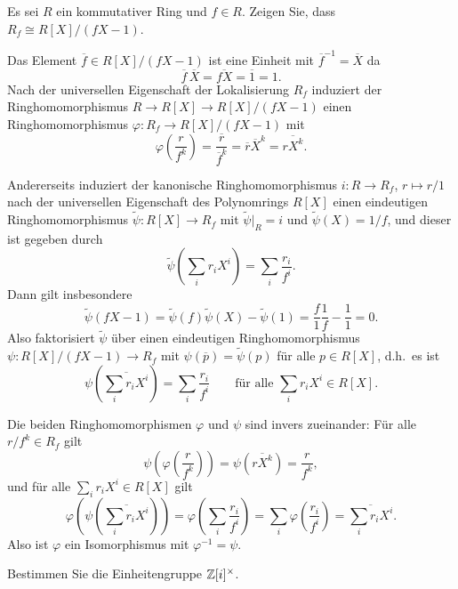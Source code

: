 

\begin{question}
  Es sei $R$ ein kommutativer Ring und $f \in R$.
  Zeigen Sie, dass $R_f \cong R[X]/(fX-1)$.
\end{question}


\begin{solution}
  Das Element $\overline{f} \in R[X]/(fX-1)$ ist eine Einheit mit $\overline{f}^{-1} = \overline{X}$ da
  \[
      \overline{f} \, \overline{X}
    = \overline{fX}
    = \overline{1}
    = 1.
  \]
  Nach der universellen Eigenschaft der Lokalisierung $R_f$ induziert der Ringhomomorphismus $R \to R[X] \to R[X]/(fX-1)$ einen Ringhomomorphismus $\varphi \colon R_f \to R[X]/(fX-1)$ mit
  \[
      \varphi\left( \frac{r}{f^k} \right)
    = \frac{\overline{r}}{\overline{f}^k}
    = \overline{r} \overline{X}^k
    = \overline{r X^k}.
  \]
  
  Andererseits induziert der kanonische Ringhomomorphismus $i \colon R \to R_f$, $r \mapsto r/1$ nach der universellen Eigenschaft des Polynomrings $R[X]$ einen eindeutigen Ringhomomorphismus $\tilde{\psi} \colon R[X] \to R_f$ mit $\tilde{\psi}|_R = i$ und $\tilde{\psi}(X) = 1/f$, und dieser ist gegeben durch
  \[
      \tilde{\psi}\left( \sum_i r_i X^i \right)
    = \sum_i \frac{r_i}{f^i}.
  \]
  Dann gilt insbesondere
  \[
      \tilde{\psi}(fX-1)
    = \tilde{\psi}(f) \tilde{\psi}(X) - \tilde{\psi}(1)
    = \frac{f}{1} \frac{1}{f} - \frac{1}{1}
    = 0.
  \]
  Also faktorisiert $\tilde{\psi}$ über einen eindeutigen Ringhomomorphismus $\psi \colon R[X]/(fX-1) \to R_f$ mit $\psi(\overline{p}) = \tilde{\psi}(p)$ für alle $p \in R[X]$, d.h.\ es ist
  \[
      \psi\left( \overline{ \sum_i r_i X^i } \right)
    = \sum_i \frac{r_i}{f^i}
    \qquad
    \text{für alle $\sum_i r_i X^i \in R[X]$}.
  \]
  
  Die beiden Ringhomomorphismen $\varphi$ und $\psi$ sind invers zueinander:
  Für alle $r/f^k \in R_f$ gilt
  \[
      \psi\left( \varphi\left( \frac{r}{f^k} \right) \right)
    = \psi\left( \overline{r X^k} \right)
    = \frac{r}{f^k},
  \]
  und für alle $\sum_i r_i X^i \in R[X]$ gilt
  \[
      \varphi\left( \psi\left( \overline{\sum_i r_i X^i} \right) \right)
    = \varphi\left( \sum_i \frac{r_i}{f^i} \right)
    = \sum_i \varphi\left( \frac{r_i}{f^i} \right)
    = \overline{\sum_i r_i X^i}.
  \]
  Also ist $\varphi$ ein Isomorphismus mit $\varphi^{-1} = \psi$.
\end{solution}


\begin{question}
  Bestimmen Sie die Einheitengruppe $\mathbb{Z}[i]^\times$.
\end{question}


